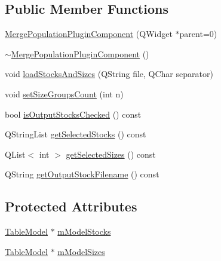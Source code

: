 \subsection*{Public Member Functions}
\begin{DoxyCompactItemize}
\item 
\mbox{\hyperlink{class_merge_population_plugin_component_a47ee304d04cd08a4123c9ef9cd33bf8c}{Merge\+Population\+Plugin\+Component}} (Q\+Widget $\ast$parent=0)
\item 
\mbox{\hyperlink{class_merge_population_plugin_component_ac29f701cf3c25065e31ef7d5bd2be49c}{$\sim$\+Merge\+Population\+Plugin\+Component}} ()
\item 
void \mbox{\hyperlink{class_merge_population_plugin_component_add21fc0f95f7da20544bd8636a51d091}{load\+Stocks\+And\+Sizes}} (Q\+String file, Q\+Char separator)
\item 
void \mbox{\hyperlink{class_merge_population_plugin_component_a308fdfeb691aa5479da976b22803f4e8}{set\+Size\+Groups\+Count}} (int n)
\item 
bool \mbox{\hyperlink{class_merge_population_plugin_component_a890bd37860504c838ae997701b310169}{is\+Output\+Stocks\+Checked}} () const
\item 
Q\+String\+List \mbox{\hyperlink{class_merge_population_plugin_component_ac2ceba431cfd6c42dbd3432a42fe2db4}{get\+Selected\+Stocks}} () const
\item 
Q\+List$<$ int $>$ \mbox{\hyperlink{class_merge_population_plugin_component_ae8143da00cbf35c403ab1dda4fb6c94f}{get\+Selected\+Sizes}} () const
\item 
Q\+String \mbox{\hyperlink{class_merge_population_plugin_component_a2d82ba9325140581bae400684aa1d080}{get\+Output\+Stock\+Filename}} () const
\end{DoxyCompactItemize}
\subsection*{Protected Attributes}
\begin{DoxyCompactItemize}
\item 
\mbox{\hyperlink{class_merge_population_plugin_component_1_1_table_model}{Table\+Model}} $\ast$ \mbox{\hyperlink{class_merge_population_plugin_component_a9c69d0d5e255c325e26544becb1ec170}{m\+Model\+Stocks}}
\item 
\mbox{\hyperlink{class_merge_population_plugin_component_1_1_table_model}{Table\+Model}} $\ast$ \mbox{\hyperlink{class_merge_population_plugin_component_acc4ffd3d2b76880a1554891f7e066a3d}{m\+Model\+Sizes}}
\end{DoxyCompactItemize}


